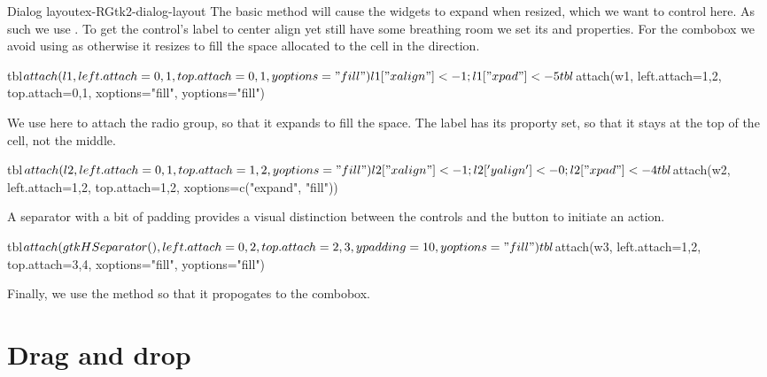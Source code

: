 \begin{example}{Dialog layout}{ex-RGtk2-dialog-layout}
The basic  method will cause the widgets to
expand when resized, which we want to control here. As such we use
. To get the control's label to center align yet still
have some breathing room we set its
 and   properties.
For the combobox we avoid using  as otherwise it resizes
to fill the space allocated to the cell in the  direction.
\begin{Schunk}
\begin{Sinput}
 tbl$attach(l1, left.attach=0,1, top.attach=0,1, yoptions="fill")
 l1["xalign"] <- 1; l1["xpad"] <- 5
 tbl$attach(w1, left.attach=1,2, top.attach=0,1, xoptions="fill", yoptions="fill")
\end{Sinput}
\end{Schunk}

We use  here to attach the radio group, so that it
expands to fill the space. The label has its  proporty
set, so that it stays at the top of the cell, not the middle.
\begin{Schunk}
\begin{Sinput}
 tbl$attach(l2, left.attach=0,1, top.attach=1,2, yoptions="fill")
 l2["xalign"] <- 1; l2['yalign'] <- 0; l2["xpad"] <- 4
 tbl$attach(w2, left.attach=1,2, top.attach=1,2, xoptions=c("expand", "fill"))
\end{Sinput}
\end{Schunk}
A separator with a bit of padding provides a visual distinction
between the controls and the button to initiate an action.
\begin{Schunk}
\begin{Sinput}
 tbl$attach(gtkHSeparator(),left.attach=0,2, top.attach=2,3, ypadding=10, yoptions="fill")
 tbl$attach(w3, left.attach=1,2, top.attach=3,4, xoptions="fill", yoptions="fill")
\end{Sinput}
\end{Schunk}
Finally, we use the  method so that it propogates to the combobox.
\begin{Schunk}
\end{Schunk}
\end{example}


\section{Drag and drop}
\label{sec:RGtk2:dnd}

